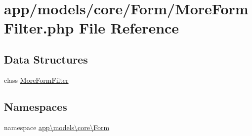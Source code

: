 \hypertarget{_more_form_filter_8php}{\section{app/models/core/\-Form/\-More\-Form\-Filter.php File Reference}
\label{_more_form_filter_8php}
}
\subsection*{Data Structures}
\begin{DoxyCompactItemize}
\item 
class \hyperlink{classapp_1_1models_1_1core_1_1_form_1_1_more_form_filter}{More\-Form\-Filter}
\end{DoxyCompactItemize}
\subsection*{Namespaces}
\begin{DoxyCompactItemize}
\item 
namespace \hyperlink{namespaceapp_1_1models_1_1core_1_1_form}{app\textbackslash{}models\textbackslash{}core\textbackslash{}\-Form}
\end{DoxyCompactItemize}

